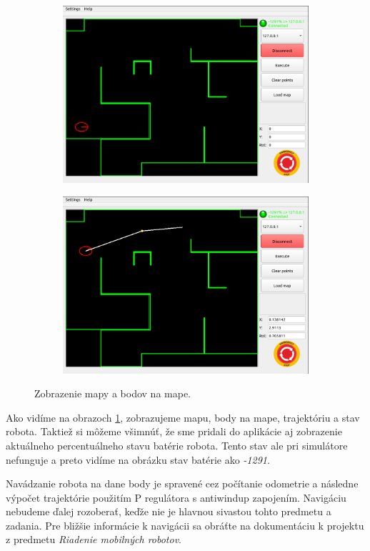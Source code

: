 \begin{figure}[!htbp]
	\vspace{1cm}
	\begin{subfigure}{0.49\textwidth}
		\includegraphics[width=\textwidth]{img/supervisor_loaded_map_start.png}
	\end{subfigure}
	\hfill
	\begin{subfigure}{0.49\textwidth}
		\includegraphics[width=\textwidth]{img/supervisor_motion.png}
	\end{subfigure}

	\caption{ Zobrazenie mapy a bodov na mape. }
	\label{fig:map}
\end{figure}

Ako vidíme na obrazoch \ref{fig:map}, zobrazujeme mapu, body na mape, trajektóriu a stav robota.
Taktiež si môžeme všimnúť, že sme pridali do aplikácie aj zobrazenie aktuálneho percentuálneho
stavu batérie robota. Tento stav ale pri simulátore nefunguje a preto vidíme na obrázku stav
batérie ako \textit{-1291}.

Navádzanie robota na dane body je spravené cez počítanie odometrie a následne výpočet trajektórie
použitím P regulátora s antiwindup zapojením. Navigáciu nebudeme ďalej rozoberať, keďže nie je hlavnou sivastou
tohto predmetu a zadania. Pre bližšie informácie k navigácii sa obráťte na dokumentáciu k projektu
z predmetu \textit{Riadenie mobilných robotov}.
